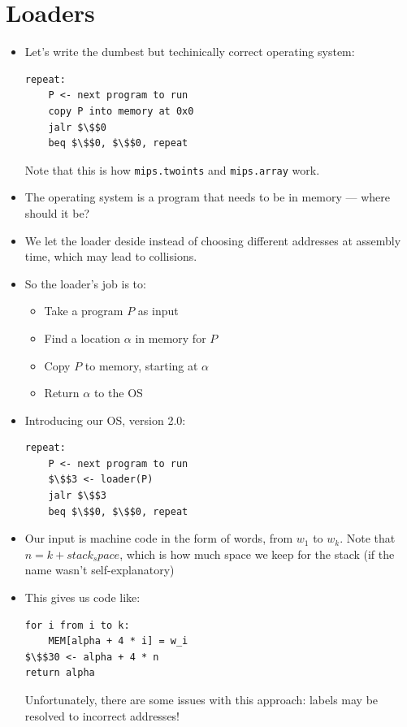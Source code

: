 \documentclass[12pt]{article}
\begin{document}
\section{Loaders}
\begin{itemize}
    \item Let's write the dumbest but techinically correct operating system:
\begin{lstlisting}[mathescape, numbers=none, breaklines=true]
repeat:
    P <- next program to run
    copy P into memory at 0x0
    jalr $\$$0
    beq $\$$0, $\$$0, repeat
\end{lstlisting}
        Note that this is how \lstinline[mathescape]{mips.twoints} and \lstinline[mathescape]{mips.array} work.
    \item The operating system is a program that needs to be in memory --- where should it be?
    \item We let the loader deside instead of choosing different addresses at assembly time, which may lead to collisions.
    \item So the loader's job is to:
        \begin{itemize}
            \item Take a program $P$ as input
            \item Find a location $\alpha$ in memory for $P$
            \item Copy $P$ to memory, starting at $\alpha$
            \item Return $\alpha$ to the OS
        \end{itemize}
    \item Introducing our OS, version 2.0:
\begin{lstlisting}[mathescape, numbers=none, breaklines=true]
repeat:
    P <- next program to run
    $\$$3 <- loader(P)
    jalr $\$$3
    beq $\$$0, $\$$0, repeat
\end{lstlisting}
    \item Our input is machine code in the form of words, from $w_1$ to $w_k$.  Note that $n = k + stack_space$, which is how much space we keep for the stack (if the name wasn't self-explanatory)
    \item This gives us code like:
\begin{lstlisting}[mathescape, numbers=none, breaklines=true]
for i from i to k:
    MEM[alpha + 4 * i] = w_i
$\$$30 <- alpha + 4 * n
return alpha
\end{lstlisting}
    Unfortunately, there are some issues with this approach: labels may be resolved to incorrect addresses!

\end{itemize}
\end{document}
